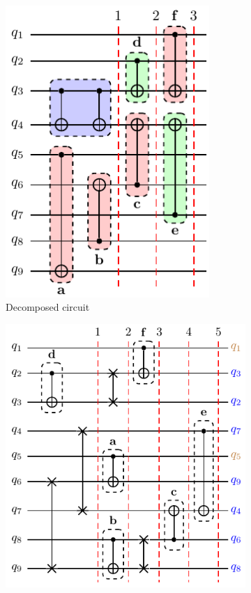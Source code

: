 \begin{figure}
\begin{subfigure}[b]{0.30\linewidth}
        \includegraphics[width=0.85\textwidth]{figures/qroute/sliced_circ.pdf}
        \caption{Decomposed circuit\label{fig:sliced_circ}}
    \end{subfigure}
    \hfill
    \begin{subfigure}[b]{0.35\linewidth}
        \includegraphics[width=\textwidth]{figures/qroute/transformed_circ.pdf}

\end{subfigure}
\end{figure}
